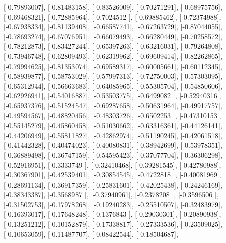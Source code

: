 \documentclass{article}
\begin{document}
       [-0.79893007],
       [-0.81483158],
       [-0.83526009],
       [-0.70271291],
       [-0.68975756],
       [-0.69468321],
       [-0.72885964],
       [-0.7024512 ],
       [-0.69885462],
       [-0.72374988],
       [-0.67938334],
       [-0.81139408],
       [-0.66587741],
       [-0.67263729],
       [-0.87044055],
       [-0.78693274],
       [-0.67076951],
       [-0.66079493],
       [-0.66280449],
       [-0.70258572],
       [-0.78212873],
       [-0.83427244],
       [-0.65397263],
       [-0.63216031],
       [-0.79264808],
       [-0.73946748],
       [-0.62809493],
       [-0.62319962],
       [-0.69609414],
       [-0.82262865],
       [-0.79994625],
       [-0.81353074],
       [-0.69589317],
       [-0.60005661],
       [-0.60112345],
       [-0.58939877],
       [-0.58753029],
       [-0.57997313],
       [-0.72750003],
       [-0.57303095],
       [-0.65312944],
       [-0.56663683],
       [-0.64085965],
       [-0.55305704],
       [-0.54850606],
       [-0.62926941],
       [-0.54016887],
       [-0.53503775],
       [-0.6499082 ],
       [-0.52940316],
       [-0.65937376],
       [-0.51524547],
       [-0.69287658],
       [-0.50631964],
       [-0.49917757],
       [-0.49594567],
       [-0.48820456],
       [-0.48303726],
       [-0.6502253 ],
       [-0.47310153],
       [-0.55145279],
       [-0.45860458],
       [-0.51030662],
       [-0.63316361],
       [-0.44126141],
       [-0.44206949],
       [-0.55811827],
       [-0.42862974],
       [-0.51190245],
       [-0.42061518],
       [-0.41442328],
       [-0.40474023],
       [-0.40080831],
       [-0.38942699],
       [-0.53978351],
       [-0.36889498],
       [-0.36747159],
       [-0.54595423],
       [-0.37077704],
       [-0.36306298],
       [-0.52916951],
       [-0.3333749 ],
       [-0.32410468],
       [-0.39281545],
       [-0.42780988],
       [-0.30367901],
       [-0.42539401],
       [-0.30854545],
       [-0.4722818 ],
       [-0.40081969],
       [-0.28691134],
       [-0.36917359],
       [-0.25831601],
       [-0.42025438],
       [-0.24246169],
       [-0.38343387],
       [-0.3568987 ],
       [-0.37940961],
       [-0.2378208 ],
       [-0.3596506 ],
       [-0.31502753],
       [-0.17978268],
       [-0.19240283],
       [-0.25510507],
       [-0.32483979],
       [-0.16393017],
       [-0.17648248],
       [-0.1376843 ],
       [-0.29030301],
       [-0.20890938],
       [-0.13251212],
       [-0.10152879],
       [-0.17338817],
       [-0.27333536],
       [-0.23509025],
       [-0.10653059],
       [-0.11487707],
       [-0.08422544],
       [-0.18504687],
\end{document}
